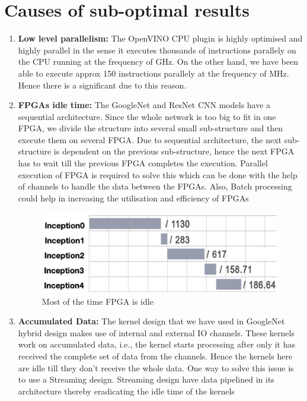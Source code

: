 \section{Causes of sub-optimal results} 
\label{sec:challenges}

\begin{enumerate}

\item\textbf{Low level parallelism: } The OpenVINO CPU plugin is highly optimised and highly parallel in the sense it executes thousands of instructions parallely on the CPU running at the frequency of GHz. On the other hand, we have been able to execute approx 150 instructions parallely at the frequency of MHz. Hence there is a significant due to this reason.
\item\textbf{FPGAs idle time: }
The GoogleNet and ResNet CNN models have a sequential architecture. Since the whole network is too big to fit in one FPGA, we divide the structure into several small sub-structure and then execute them on several FPGA. Due to sequential architecture, the next sub-structure is dependent on the previous sub-structure, hence the next FPGA has to wait till the previous FPGA completes the execution.
Parallel execution of FPGA is required to solve this which can be done with the help of channels to handle the data between the FPGAs. Also, Batch processing could help in increasing the utilisation and efficiency of FPGAs
\begin{figure}[h!]
  \includegraphics[width=\textwidth,height=\textheight,keepaspectratio]{img/fpga_idle.png}
  \caption{Most of the time FPGA is idle }
  \label{fig:FPGA_idle_time}
\end{figure}
\item\textbf{Accumulated Data: }
The kernel design that we have used in GoogleNet hybrid design makes use of internal and external IO channels. These kernels work on accumulated data, i.e., the kernel starts processing after only it has received the complete set of data from the channels. Hence the kernels here are idle till they don’t receive the whole data. One way to solve this issue is to use a Streaming design. Streaming design have data pipelined in its architecture thereby eradicating the idle time of the kernels

\end{enumerate}
